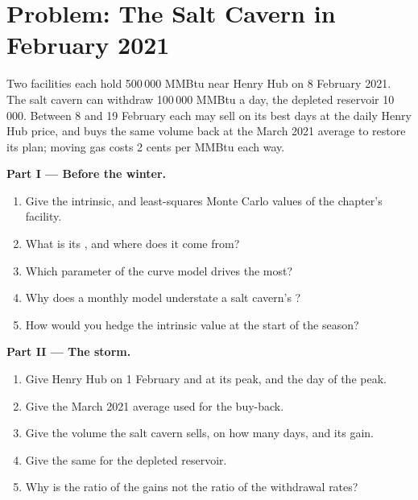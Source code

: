 \section{Problem: The Salt Cavern in February 2021}

\begin{problem}\label{pb:rc:commodity-and-energy-derivatives:1}
Two facilities each hold 500\,000 MMBtu near Henry Hub on 8 February 2021. The salt cavern
can withdraw 100\,000 MMBtu a day, the depleted reservoir 10\,000. Between 8 and 19 February
each may sell on its best days at the daily Henry Hub price, and buys the same volume back
at the March 2021 average to restore its plan; moving gas costs 2 cents per MMBtu each way.

\medskip\noindent\textbf{Part I --- Before the winter.}
\begin{enumerate}
\item Give the intrinsic,  and least-squares Monte Carlo values of the
chapter's facility.
\item What is its , and where does it come from?
\item Which parameter of the curve model drives the  most?
\item Why does a monthly model understate a salt cavern's ?
\item How would you hedge the intrinsic value at the start of the season?
\end{enumerate}

\medskip\noindent\textbf{Part II --- The storm.}
\begin{enumerate}[resume]
\item Give Henry Hub on 1 February and at its peak, and the day of the peak.
\item Give the March 2021 average used for the buy-back.
\item Give the volume the salt cavern sells, on how many days, and its gain.
\item Give the same for the depleted reservoir.
\item Why is the ratio of the gains not the ratio of the withdrawal rates?
\end{enumerate}


\end{problem}
